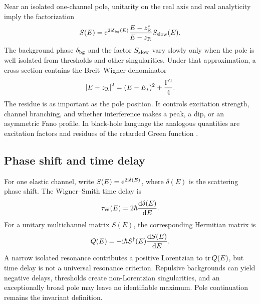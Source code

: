Near an isolated one-channel pole, unitarity on the real axis and real
analyticity imply the factorization
\begin{equation}
  S(E)=\mathrm{e}^{2\mathrm{i}\delta_{\mathrm{bg}}(E)}
  \frac{E-z_{\mathrm{R}}^*}{E-z_{\mathrm{R}}}
  S_{\mathrm{slow}}(E) .
  \label{eq:S-pole-factorization}
\end{equation}
The background phase $\delta_{\mathrm{bg}}$ and the factor
$S_{\mathrm{slow}}$ vary slowly only when the pole is well isolated from
thresholds and other singularities.  Under that approximation, a cross
section contains the Breit--Wigner denominator
\begin{equation}
  \left|E-z_{\mathrm{R}}\right|^2
  =(E-E_*)^2+\frac{\Gamma^2}{4} .
  \label{eq:breit-wigner-denominator}
\end{equation}
The residue is as important as the pole position.  It controls excitation
strength, channel branching, and whether interference makes a peak, a dip, or
an asymmetric Fano profile.  In black-hole language the analogous quantities
are excitation factors and residues of the retarded Green function
\cite{Andersson:1995zk,Oshita:2024wgt,Kubota:2025hjk}.

\subsection{Phase shift and time delay}
\label{subsec:time-delay}

For one elastic channel, write $S(E)=\mathrm{e}^{2\mathrm{i}\delta(E)}$, where
$\delta(E)$ is the scattering phase shift.  The Wigner--Smith time delay is
\begin{equation}
  \tau_{\mathrm{W}}(E)
  =2\hbar\frac{\mathrm{d}\delta(E)}{\mathrm{d} E} .
  \label{eq:wigner-delay}
\end{equation}
For a unitary multichannel matrix $S(E)$, the corresponding Hermitian matrix is
\begin{equation}
  Q(E)=-\mathrm{i}\hbar S^{\dagger}(E)
  \frac{\mathrm{d} S(E)}{\mathrm{d} E} .
  \label{eq:smith-matrix}
\end{equation}
A narrow isolated resonance contributes a positive Lorentzian to
$\operatorname{tr} Q(E)$, but time delay is not a universal resonance criterion.  Repulsive
backgrounds can yield negative delays, thresholds create non-Lorentzian
singularities, and an exceptionally broad pole may leave no identifiable
maximum.  Pole continuation remains the invariant definition.

